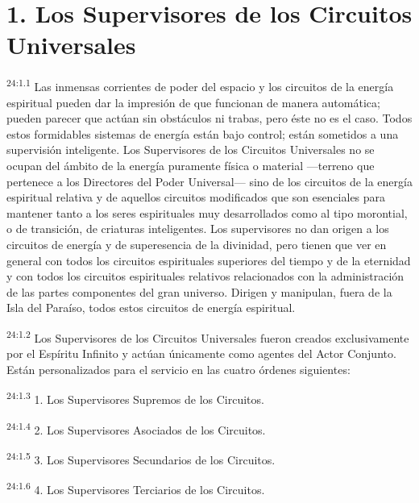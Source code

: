 \section*{1. Los Supervisores de los Circuitos Universales}
\par
\textsuperscript{24:1.1} Las inmensas corrientes de poder del espacio y los circuitos de la energía espiritual pueden dar la impresión de que funcionan de manera automática; pueden parecer que actúan sin obstáculos ni trabas, pero éste no es el caso. Todos estos formidables sistemas de energía están bajo control; están sometidos a una supervisión inteligente. Los Supervisores de los Circuitos Universales no se ocupan del ámbito de la energía puramente física o material ---terreno que pertenece a los Directores del Poder Universal--- sino de los circuitos de la energía espiritual relativa y de aquellos circuitos modificados que son esenciales para mantener tanto a los seres espirituales muy desarrollados como al tipo morontial, o de transición, de criaturas inteligentes. Los supervisores no dan origen a los circuitos de energía y de superesencia de la divinidad, pero tienen que ver en general con todos los circuitos espirituales superiores del tiempo y de la eternidad y con todos los circuitos espirituales relativos relacionados con la administración de las partes componentes del gran universo. Dirigen y manipulan, fuera de la Isla del Paraíso, todos estos circuitos de energía espiritual.

\par
\textsuperscript{24:1.2} Los Supervisores de los Circuitos Universales fueron creados exclusivamente por el Espíritu Infinito y actúan únicamente como agentes del Actor Conjunto. Están personalizados para el servicio en las cuatro órdenes siguientes:

\par
\textsuperscript{24:1.3} 1. Los Supervisores Supremos de los Circuitos.

\par
\textsuperscript{24:1.4} 2. Los Supervisores Asociados de los Circuitos.

\par
\textsuperscript{24:1.5} 3. Los Supervisores Secundarios de los Circuitos.

\par
\textsuperscript{24:1.6} 4. Los Supervisores Terciarios de los Circuitos.

